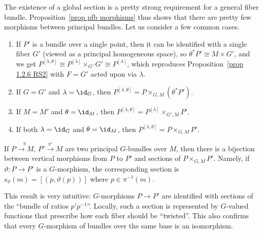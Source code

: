 \begin{example}
    The existence of a global section is a pretty strong requirement for a general fiber bundle. Proposition~\ref{prop pfb morphisms} thus shows that there are pretty few morphisms between principal bundles. Let us consider a few common cases.
    \begin{enumerate}
        \item If $P'$ is a bundle over a single point, then it can be identified with a single fiber $G'$ (viewed as a principal homogeneous space), so $\theta^\ast P'\cong M\times G'$, and we get $P^{[\lambda,\theta]}\cong P^{[\lambda]}\times_{G'}G'\cong P^{[\lambda]}$, which reproduces Proposition~\ref{prop 1.2.6 RS2} with $F=G'$ acted upon via $\lambda$.
        \item If $G=G'$ and $\lambda=\id_G$, then $P^{[\lambda,\theta]}=P\times_{G,M}(\theta^\ast P')$. 
        \item If $M=M'$ and $\theta=\id_M$, then $P^{[\lambda,\theta]}=P^{[\lambda]}\times_{G',M}P'$. 
        \item If both $\lambda=\id_G$ and $\theta=\id_M$, then $P^{[\lambda,\theta]}=P\times_{G,M}P'$. 
    \end{enumerate}
\end{example}

\begin{cor}[{{\cite[Cor.~1.2.7]{RS2}}}]\label{cor 1.2.7 RS2}
    If $P\overset{\pi}{\to M}$, $P'\overset{\pi'}{\to}M$ are two principal $G$-bundles over $M$, then there is a bijection between vertical morphisms from $P$ to $P'$ and sections of $P\times_{G,M}P'$. Namely, if $\vartheta:P\to P'$ is a $G$-morphism, the corresponding section is $s_\vartheta(m)=[(p,\vartheta(p))]$ where $p\in\pi^{-1}(m)$.
\end{cor}
This result is very intuitive: $G$-morphisms $P\to P'$ are identified with sections of the ``bundle of ratios $p'p^{-1}$''. Locally, such a section is represented by $G$-valued functions that prescribe how each fiber should be ``twisted''. This also confirms that every $G$-morphism of bundles over the same base is an isomorphism.

